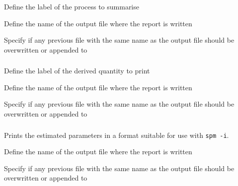  {Define the label of the process to summarise}

 {Define the name of the output file where the report is written}

 {Specify if any previous file with the same name as the output file should be overwritten or appended to}

\subsubsection[Print a derived quantity]{}

 {Define the label of the derived quantity to print}

 {Define the name of the output file where the report is written}

 {Specify if any previous file with the same name as the output file should be overwritten or appended to}

\subsubsection[Printing the estimated parameter values out as a vector]{\label{sec:InputFileFormat}}

Prints the estimated parameters in a format suitable for use with \texttt{spm -i}.

 {Define the name of the output file where the report is written}

 {Specify if any previous file with the same name as the output file should be overwritten or appended to}

